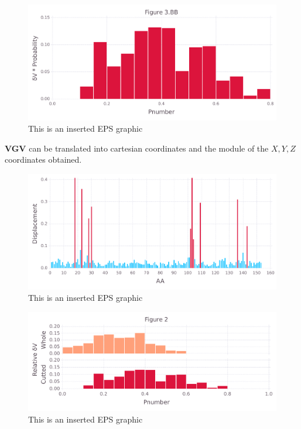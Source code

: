 \documentclass[10pt,letterpaper]{article}
\begin{document}
\begin{figure}[ht]
\begin{center}
\includegraphics[scale=0.5]{256l/3bbfigure_hi-precision.pdf}
\caption{This is an inserted EPS graphic}
\label{fig11}
\end{center}
\end{figure}

\FloatBarrier


\textbf{VGV} can be translated into cartesian coordinates and the module of the \(X, Y, Z\) coordinates obtained.

\begin{figure}[ht]
\begin{center}
\includegraphics[scale=0.5]{256l/5figure_hi-precision.pdf}
\caption{This is an inserted EPS graphic}
\label{fig13}
\end{center}
\end{figure}
              
\begin{figure}[ht]
\begin{center}
\includegraphics[scale=0.5]{256l/3_both_hi-precision.pdf}
\caption{This is an inserted EPS graphic}
\label{fig13}
\end{center}
\end{figure}
\end{document}

